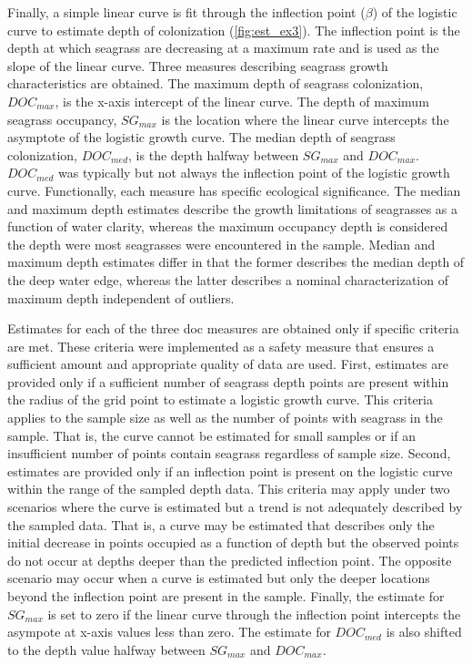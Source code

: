 \documentclass[letterpaper,12pt,oneside]{article}\usepackage[]{graphicx}\usepackage[]{color}
\begin{document}
Finally, a simple linear curve is fit through the inflection point ($\beta$) of the logistic curve to estimate depth of colonization (\cref{fig:est_ex3}).  The inflection point is the depth at which seagrass are decreasing at a maximum rate and is used as the slope of the linear curve.  Three measures describing seagrass growth characteristics are obtained. The maximum depth of seagrass colonization, $DOC_{max}$, is the x-axis intercept of the linear curve.  The depth of maximum seagrass occupancy, $SG_{max}$ is the location where the linear curve intercepts the asymptote of the logistic growth curve.  The median depth of seagrass colonization, $DOC_{med}$, is the depth halfway between $SG_{max}$ and $DOC_{max}$.  $DOC_{med}$ was typically but not always the inflection point of the logistic growth curve.  Functionally, each measure has specific ecological significance.  The median and maximum depth estimates describe the growth limitations of seagrasses as a function of water clarity, whereas the maximum occupancy depth is considered the depth were most seagrasses were encountered in the sample.  Median and maximum depth estimates differ in that the former describes the median depth of the deep water edge, whereas the latter describes a nominal characterization of maximum depth independent of outliers.

Estimates for each of the three \ac{doc} measures are obtained only if specific criteria are met.  These criteria were implemented as a safety measure that ensures a sufficient amount and appropriate quality of data are used.  First, estimates are provided only if a sufficient number of seagrass depth points are present within the radius of the grid point to estimate a logistic growth curve.  This criteria applies to the sample size as well as the number of points with seagrass in the sample.  That is, the curve cannot be estimated for small samples or if an insufficient number of points contain seagrass regardless of sample size.  Second, estimates are provided only if an inflection point is present on the logistic curve within the range of the sampled depth data.  This criteria may apply under two scenarios where the curve is estimated but a trend is not adequately described by the sampled data.  That is, a curve may be estimated that describes only the initial decrease in points occupied as a function of depth but the observed points do not occur at depths deeper than the predicted inflection point.  The opposite scenario may occur when a curve is estimated but only the deeper locations beyond the inflection point are present in the sample.  Finally, the estimate for $SG_{max}$ is set to zero if the linear curve through the inflection point intercepts the asympote at x-axis values less than zero.  The estimate for $DOC_{med}$ is also shifted to the depth value halfway between $SG_{max}$ and $DOC_{max}$.  
\end{document}
